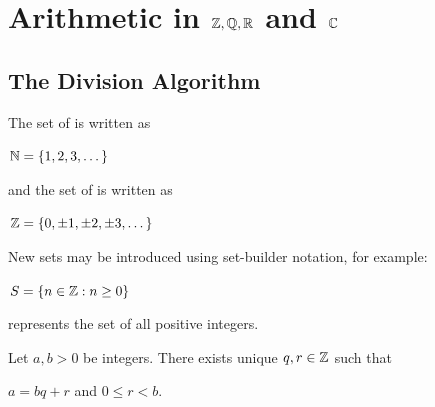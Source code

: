 \documentclass[11pt,fleqn,dvipsnames,usenames]{article}
\renewcommand{\headrulewidth}{1pt}
\newcommand{\p}{\noindent}
\begin{document}
\fancyhead[R]{\term}
\renewcommand{\headrulewidth}{0.4pt}


\setcounter{section}{0}
\section{Arithmetic in \texorpdfstring{$\mathbb{Z}, \mathbb{Q}, \mathbb{R}$}{Z, Q, R} and \texorpdfstring{$\mathbb{C}$}{C}}
\setcounter{subsection}{0}


\subsection{The Division Algorithm}

The set of  is written as
\begin{center}
$\mathbb{N} = \left\{1,2,3,\dots\right\}$
\end{center}
and the set of  is written as
\begin{center}
\item $\mathbb{Z} = \left\{0, \pm 1, \pm 2,\pm 3,\dots\right\}$
\end{center}
\vsp

\p New sets may be introduced using set-builder notation, for example:
\begin{center}
$S = \left\{n\in\mathbb{Z}:n\geq 0\right\}$
\end{center}
represents the set of all positive integers.
\vsp

\begin{theorem} Let $a,b > 0$ be integers.  There exists unique $q,r\in\mathbb{Z}$ such that
\begin{center}
$a = bq + r$ and $0\leq r < b$.
\end{center}
\end{theorem}
\end{document}
